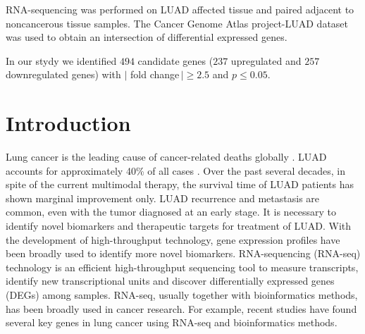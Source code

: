 \documentclass[
10pt, %
a4paper, %
oneside, %
headinclude,footinclude, %
BCOR5mm, %
]{scrartcl}
\begin{document}
RNA-sequencing was performed on LUAD affected tissue and paired adjacent to noncancerous tissue samples. The Cancer Genome Atlas project-LUAD dataset was used to obtain an intersection of differential expressed genes.

In our stydy we identified $494$ candidate genes ($237$ upregulated and $257$ downregulated genes) with $|$ fold change$\, | \ge 2.5$ and $p \le 0.05$.


\newpage %


\section{Introduction}

Lung cancer is the leading cause of cancer-related deaths globally \cite{article:1}. LUAD accounts for approximately 40\% of all cases \cite{article:2}. Over the past several decades, in spite of the current multimodal therapy, the survival time of LUAD patients has shown marginal improvement only. LUAD recurrence and metastasis are common, even with the tumor diagnosed at an early stage. \cite{article:3}  It is necessary to identify novel biomarkers and therapeutic targets for treatment of LUAD. With the development of high-throughput technology, gene expression profiles have been broadly used to identify more novel biomarkers. RNA-sequencing (RNA-seq) technology is an efficient high-throughput sequencing tool to measure transcripts, identify new transcriptional units and discover differentially expressed genes (DEGs) among samples. RNA-seq, usually together with bioinformatics methods, has been broadly used in cancer research. For example, recent studies have found several key genes in lung cancer using RNA-seq and bioinformatics methods. \cite{article:4} \cite{article:5}


 
\end{document}
